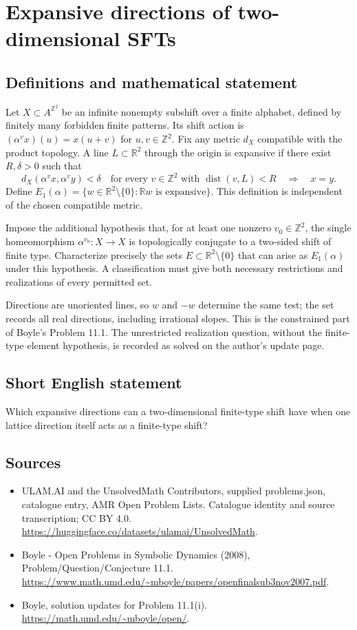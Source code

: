 \documentclass[11pt,a4paper]{article}
\begin{document}
\section*{Expansive directions of two-dimensional SFTs}\label{statement}

\subsection{Definitions and mathematical statement}
Let $X\subset A^{\mathbb Z^2}$ be an infinite nonempty subshift over a finite
alphabet, defined by finitely many forbidden finite patterns. Its shift
action is $(\alpha^v x)(u)=x(u+v)$ for $u,v\in\mathbb Z^2$. Fix any metric
$d_X$ compatible with the product topology. A line $L\subset\mathbb R^2$
through the origin is expansive if there exist $R,\delta>0$ such that
\[
 d_X(\alpha^v x,\alpha^v y)<\delta\quad
 \text{for every }v\in\mathbb Z^2\text{ with }\operatorname{dist}(v,L)<R
 \quad\Longrightarrow\quad x=y.
\]
Define $E_1(\alpha)=\{w\in\mathbb R^2\setminus\{0\}:\mathbb Rw
\text{ is expansive}\}$. This definition is independent of the chosen
compatible metric.

Impose the additional hypothesis that, for at least one nonzero
$v_0\in\mathbb Z^2$, the single homeomorphism $\alpha^{v_0}:X\to X$ is
topologically conjugate to a two-sided shift of finite type. Characterize
precisely the sets $E\subset\mathbb R^2\setminus\{0\}$ that can arise as
$E_1(\alpha)$ under this hypothesis. A classification must give both
necessary restrictions and realizations of every permitted set.

Directions are unoriented lines, so $w$ and $-w$ determine the same test;
the set records all real directions, including irrational slopes.
This is the constrained part of Boyle's Problem 11.1. The unrestricted
realization question, without the finite-type element hypothesis, is
recorded as solved on the author's update page.
\subsection{Short English statement}
Which expansive directions can a two-dimensional finite-type shift have when one lattice direction itself acts as a finite-type shift?
\subsection{Sources}
\begin{itemize}
\item[S1] ULAM.AI and the UnsolvedMath Contributors, supplied problems.json, catalogue entry, AMR Open Problem Lists. Catalogue identity and source transcription; CC BY 4.0.
\url{https://huggingface.co/datasets/ulamai/UnsolvedMath}.
\item[S2] Boyle - Open Problems in Symbolic Dynamics (2008), Problem/Question/Conjecture 11.1. 
\url{https://www.math.umd.edu/~mboyle/papers/openfinalsub3nov2007.pdf}.
\item[S3] Boyle, solution updates for Problem 11.1(i).
\url{https://math.umd.edu/~mboyle/open/}.
\end{itemize}
\end{document}
